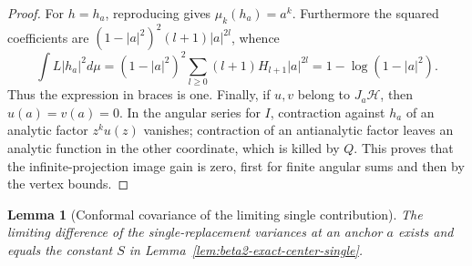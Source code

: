 \documentclass[11pt,a4paper]{article}
\numberwithin{equation}{section}
\newtheorem{lemma}[theorem]{Lemma}
\theoremstyle{definition}
\theoremstyle{remark}
\begin{document}
\begin{proof}
For $h=h_a$, reproducing gives $\mu_k(h_a)=a^k$.
Furthermore the squared coefficients are
$(1-|a|^2)^2(l+1)|a|^{2l}$, whence
\[
 \int L|h_a|^2d\mu
 =(1-|a|^2)^2\sum_{l\ge0}(l+1)H_{l+1}|a|^{2l}
 =1-\log(1-|a|^2).
\]
Thus the expression in braces is one.  Finally, if $u,v$ belong
to $J_a\mathcal H$, then $u(a)=v(a)=0$.  In the angular series
for $I$, contraction against $h_a$ of an analytic factor
$z^ku(z)$ vanishes; contraction of an antianalytic factor leaves
an analytic function in the other coordinate, which is killed
by $Q$.  This proves that the infinite-projection image gain is
zero, first for finite angular sums and then by the vertex bounds.
\end{proof}

\begin{lemma}[Conformal covariance of the limiting single contribution]
\label{lem:beta2-single-conformal}
The limiting difference of the single-replacement variances at
an anchor $a$ exists and equals the constant $S$ in
Lemma~\ref{lem:beta2-exact-center-single}.
\end{lemma}
\end{document}
